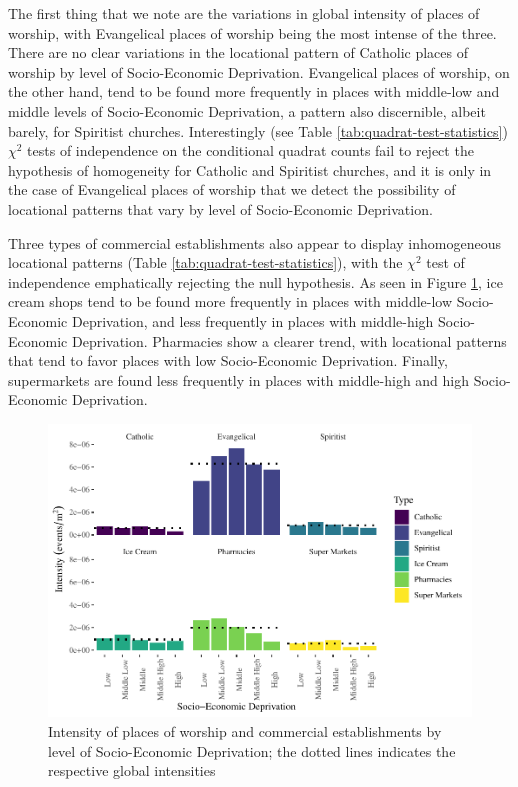 \documentclass[smallextended]{svjour3}       %
\begin{document}
The first thing that we note are the variations in global intensity of
places of worship, with Evangelical places of worship being the most
intense of the three. There are no clear variations in the locational
pattern of Catholic places of worship by level of Socio-Economic
Deprivation. Evangelical places of worship, on the other hand, tend to
be found more frequently in places with middle-low and middle levels of
Socio-Economic Deprivation, a pattern also discernible, albeit barely,
for Spiritist churches. Interestingly (see Table
\ref{tab:quadrat-test-statistics}) \(\chi^2\) tests of independence on
the conditional quadrat counts fail to reject the hypothesis of
homogeneity for Catholic and Spiritist churches, and it is only in the
case of Evangelical places of worship that we detect the possibility of
locational patterns that vary by level of Socio-Economic Deprivation.

Three types of commercial establishments also appear to display
inhomogeneous locational patterns (Table
\ref{tab:quadrat-test-statistics}), with the \(\chi^2\) test of
independence emphatically rejecting the null hypothesis. As seen in
Figure \ref{fig:plot-events-quadrat}, ice cream shops tend to be found
more frequently in places with middle-low Socio-Economic Deprivation,
and less frequently in places with middle-high Socio-Economic
Deprivation. Pharmacies show a clearer trend, with locational patterns
that tend to favor places with low Socio-Economic Deprivation. Finally,
supermarkets are found less frequently in places with middle-high and
high Socio-Economic Deprivation.

\begin{figure}
\centering
\includegraphics{Moral_Communities_and_Crime_files/figure-latex/plot-events-quadrat-1.pdf}
\caption{\label{fig:plot-events-quadrat}Intensity of places of worship
and commercial establishments by level of Socio-Economic Deprivation;
the dotted lines indicates the respective global intensities}
\end{figure}
\end{document}
